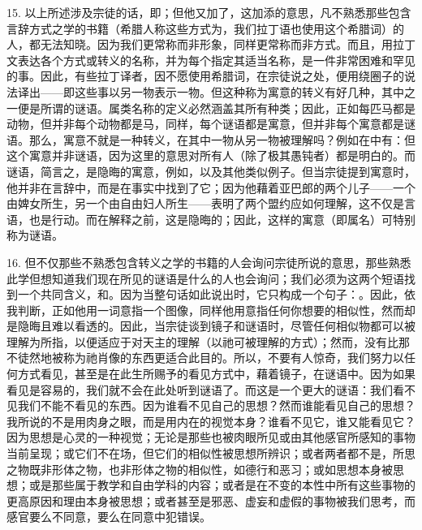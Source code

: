 15. 以上所述涉及宗徒的话，即；但他又加了，这加添的意思，凡不熟悉那些包含言辞方式之学的书籍（希腊人称这些方式为，我们拉丁语也使用这个希腊词）的人，都无法知晓。因为我们更常称而非形象，同样更常称而非方式。而且，用拉丁文表达各个方式或转义的名称，并为每个指定其适当名称，是一件非常困难和罕见的事。因此，有些拉丁译者，因不愿使用希腊词，在宗徒说之处，便用绕圈子的说法译出——即这些事以另一物表示一物。但这种称为寓意的转义有好几种，其中之一便是所谓的谜语。属类名称的定义必然涵盖其所有种类；因此，正如每匹马都是动物，但并非每个动物都是马，同样，每个谜语都是寓意，但并非每个寓意都是谜语。那么，寓意不就是一种转义，在其中一物从另一物被理解吗？例如在中有：但这个寓意并非谜语，因为这里的意思对所有人（除了极其愚钝者）都是明白的。而谜语，简言之，是隐晦的寓意，例如，以及其他类似例子。但当宗徒提到寓意时，他并非在言辞中，而是在事实中找到了它；因为他藉着亚巴郎的两个儿子——一个由婢女所生，另一个由自由妇人所生——表明了两个盟约应如何理解，这不仅是言语，也是行动。而在解释之前，这是隐晦的；因此，这样的寓意（即属名）可特别称为谜语。\par

16. 但不仅那些不熟悉包含转义之学的书籍的人会询问宗徒所说的意思，那些熟悉此学但想知道我们现在所见的谜语是什么的人也会询问；我们必须为这两个短语找到一个共同含义，和。因为当整句话如此说出时，它只构成一个句子：。因此，依我判断，正如他用一词意指一个图像，同样他用意指任何你想要的相似性，然而却是隐晦且难以看透的。因此，当宗徒谈到镜子和谜语时，尽管任何相似物都可以被理解为所指，以便适应于对天主的理解（以祂可被理解的方式）；然而，没有比那不徒然地被称为祂肖像的东西更适合此目的。所以，不要有人惊奇，我们努力以任何方式看见，甚至是在此生所赐予的看见方式中，藉着镜子，在谜语中。因为如果看见是容易的，我们就不会在此处听到谜语了。而这是一个更大的谜语：我们看不见我们不能不看见的东西。因为谁看不见自己的思想？然而谁能看见自己的思想？我所说的不是用肉身之眼，而是用内在的视觉本身？谁看不见它，谁又能看见它？因为思想是心灵的一种视觉；无论是那些也被肉眼所见或由其他感官所感知的事物当前呈现；或它们不在场，但它们的相似性被思想所辨识；或者两者都不是，所思之物既非形体之物，也非形体之物的相似性，如德行和恶习；或如思想本身被思想；或是那些属于教学和自由学科的内容；或者是在不变的本性中所有这些事物的更高原因和理由本身被思想；或者甚至是邪恶、虚妄和虚假的事物被我们思考，而感官要么不同意，要么在同意中犯错误。\par


